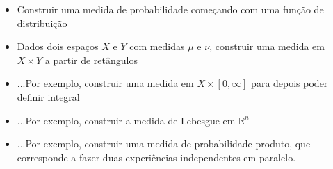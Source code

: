 \documentclass{article}
\newcommand{\R}{\mathbb{R}}
\begin{document}
\begin{itemize}
\begin{itemize}
\item Construir uma medida de probabilidade começando com uma função de distribuição
\item Dados dois espaços $X$ e $Y$ com medidas $\mu$ e $\nu$, construir uma medida em $X \times Y$ a partir de retângulos
\item ...Por exemplo, construir uma medida em $X \times \left[0,\infty\right]$ para depois poder definir integral
\item ...Por exemplo, construir a medida de Lebesgue em $\R^n$
\item ...Por exemplo, construir uma medida de probabilidade produto, que corresponde a fazer duas experiências independentes em paralelo.
\end{itemize}
\end{itemize}
\end{document}
